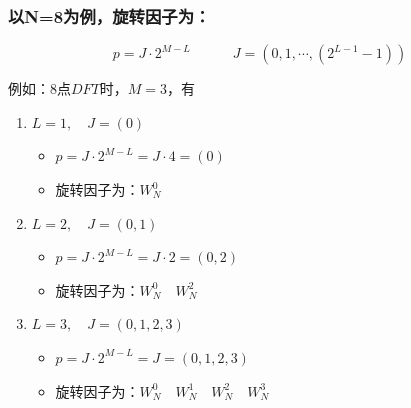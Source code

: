 \documentclass[notheorems,compress,mathserif,table]{beamer}
\begin{document}
%
%
%
\begin{frame}[shrink]\frametitle{以N=8为例，旋转因子为：}%
$$p=J\cdot 2^{M-L} \quad\quad\quad J=(0,1,\cdots,(2^{L-1}-1))$$
\par 例如：8点$DFT$时，$M=3$，有
\begin{enumerate}
  \item $L=1,\quad J=(0)  $%
        \begin{itemize}
          \item $p=J\cdot 2^{M-L}=J\cdot 4=(0)$
          \item $\mbox{旋转因子为：}  W_{N}^{0}$
        \end{itemize}
  \item $L=2,\quad J=(0,1) $%
        \begin{itemize}
          \item $p=J\cdot 2^{M-L}=J\cdot2=(0,2)$
          \item $\mbox{旋转因子为：}  W_{N}^{0}\quad W_{N}^{2}$
        \end{itemize}
  \item $L=3,\quad J=(0,1,2,3)$%
        \begin{itemize}
          \item $p=J\cdot 2^{M-L}=J=(0,1,2,3)$
          \item $\mbox{旋转因子为：}  W_{N}^{0}\quad W_{N}^{1}\quad W_{N}^{2}\quad W_{N}^{3}$
        \end{itemize}
\end{enumerate}

\end{frame}
%
%
%
\end{document}
